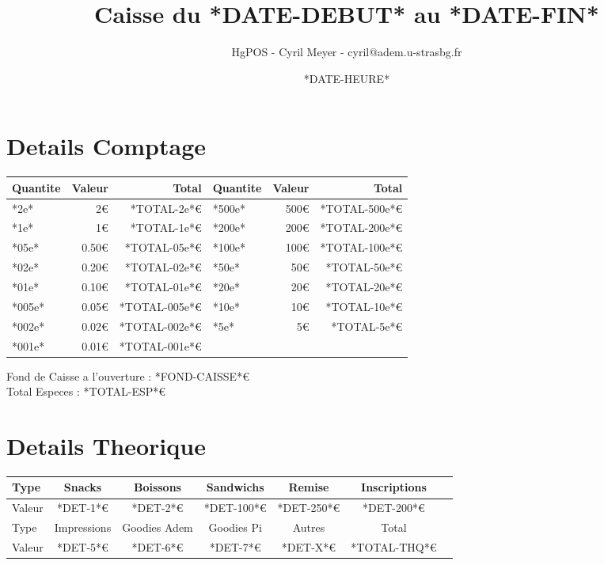 \documentclass{article}
\title{Caisse du *DATE-DEBUT* au *DATE-FIN*}
\author{HgPOS - Cyril Meyer - cyril@adem.u-strasbg.fr}
\date{*DATE-HEURE*}
\begin{document}
\maketitle

\section{Details Comptage}
\centering

\begin{tabular}{|l|r|r||l|r|r|}
  \hline
  Quantite & Valeur & Total & Quantite & Valeur & Total \\
  \hline
  *2e* & 2\euro & *TOTAL-2e*\euro 		& *500e* & 500\euro & *TOTAL-500e*\euro \\
  \hline
  *1e* & 1\euro & *TOTAL-1e*\euro 		& *200e* & 200\euro & *TOTAL-200e*\euro \\
  \hline
  *05e* & 0.50\euro & *TOTAL-05e*\euro 	& *100e* & 100\euro & *TOTAL-100e*\euro \\
  \hline
  *02e* & 0.20\euro & *TOTAL-02e*\euro 	& *50e* & 50\euro & *TOTAL-50e*\euro \\
  \hline
  *01e* & 0.10\euro & *TOTAL-01e*\euro 	& *20e* & 20\euro & *TOTAL-20e*\euro \\
  \hline
  *005e* & 0.05\euro & *TOTAL-005e*\euro 	& *10e* & 10\euro & *TOTAL-10e*\euro \\
  \hline
  *002e* & 0.02\euro & *TOTAL-002e*\euro 	& *5e* & 5\euro & *TOTAL-5e*\euro \\
  \hline
  *001e* & 0.01\euro & *TOTAL-001e*\euro 	&  &  &  \\
  \hline
\end{tabular}
\raggedright
\linebreak
Fond de Caisse a l'ouverture : *FOND-CAISSE*\euro \\
Total Especes : *TOTAL-ESP*\euro \\

\section{Details Theorique}

\begin{tabular}{|l|c|c|c|c|c|c|}
  \hline
  Type & Snacks & Boissons & Sandwichs  & Remise & Inscriptions \\
  \hline
  Valeur & *DET-1*\euro  & *DET-2*\euro  & *DET-100*\euro  & *DET-250*\euro & *DET-200*\euro \\
  \hline
  Type & Impressions & Goodies Adem & Goodies Pi  & Autres & Total \\
  \hline
  Valeur & *DET-5*\euro  & *DET-6*\euro  & *DET-7*\euro   & *DET-X*\euro  & *TOTAL-THQ*\euro   \\
  \hline
\end{tabular}
\end{document}
